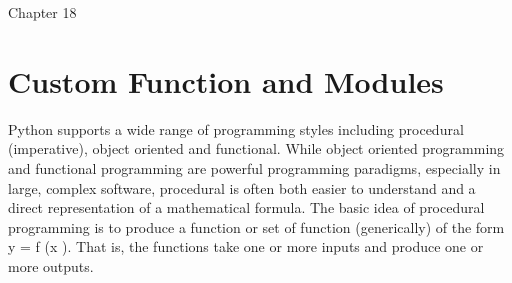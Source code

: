 Chapter 18


\section{Custom Function and Modules}
Python supports a wide range of programming styles including procedural (imperative), object oriented
and functional. While object oriented programming and functional programming are powerful programming
paradigms, especially in large, complex software, procedural is often both easier to understand and a
direct representation of a mathematical formula. The basic idea of procedural programming is to produce
a function or set of function (generically) of the form
y = f (x ).
That is, the functions take one or more inputs and produce one or more outputs.

